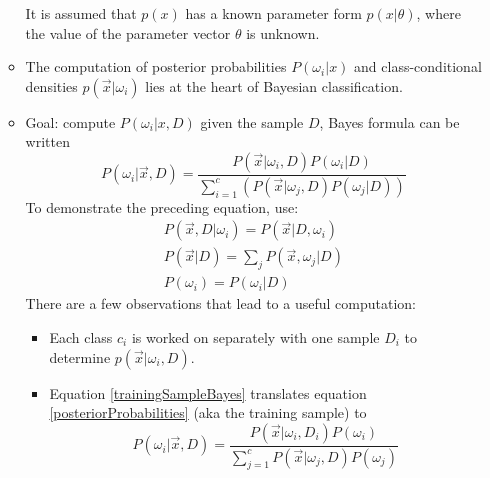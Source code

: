 \documentclass[11pt]{article}
\begin{document}
\begin{itemize}
\begin{itemize}
		It is assumed that $p(x)$ has a known parameter form $p(x|\theta)$, where the value of the parameter vector $\theta$ is unknown.
		\item The computation of posterior probabilities $P(\omega_i | x)$ and class-conditional densities $p(\vec{x} | \omega_i)$ lies at the heart of Bayesian classification.
		\item Goal: compute $P(\omega_i | x , D)$ given the sample $D$, Bayes formula can be written \cite[91]{duda-hart-stork}
		\begin{equation}
			P(\omega_i | \vec{x} , D) = \frac{P ( \vec{x}| \omega_i, D  ) P(\omega_i | D)} {\sum_{i=1}^c (P(\vec{x}| \omega_j, D) P(\omega_j |D)  ) } \label{posteriorProbabilities}
		\end{equation}
		To demonstrate the preceding equation, use:
		\begin{eqnarray}
			P(\vec{x}, D | \omega_i) = P(\vec{x} | D, \omega_i) \\
			P( \vec{x} |D ) = \sum_j P(\vec{x}, \omega_j | D) \\
			P(\omega_i) = P(\omega_i | D) \label{trainingSampleBayes}
		\end{eqnarray} 
		There are a few observations that lead to a useful computation:
		\begin{itemize}
			\item Each class $c_i$ is worked on separately with one sample $D_i$ to determine $p(\vec{x} | \omega_i , D)$.
			\item Equation \ref{trainingSampleBayes} translates equation \ref{posteriorProbabilities} (aka the training sample) to %
			\begin{equation}
				P(\omega_i | \vec{x}, D) = \frac{P ( \vec{x} | \omega_i , D_i) P(\omega_i) } {\sum_{j=1}^c P(\vec{x} | \omega_j , D) P(\omega_j)}
			\end{equation}
			

\end{itemize}
\end{itemize}
\end{itemize}
\end{document}
